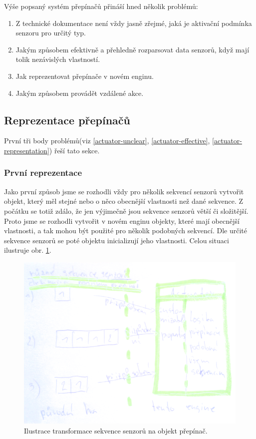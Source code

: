 Výše popsaný systém přepínačů přináší hned několik problémů:
\begin{enumerate}
\item\label{actuator-unclear} Z technické dokumentace\cite{TechnicalDocumentationFontanel05} není vždy jasně zřejmé, jaká je aktivační podmínka senzoru pro určitý typ.
\item\label{actuator-effective} Jakým způsobem efektivně a přehledně rozparsovat data senzorů, když mají tolik nezávislých vlastností.
\item\label{actuator-representation} Jak reprezentovat přepínače v novém enginu.
\item\label{actuator-remote-actions} Jakým způsobem provádět vzdálené akce.
\end{enumerate}

\subsection{Reprezentace přepínačů}
První tři body problémů(viz \ref{actuator-unclear}, \ref{actuator-effective}, \ref{actuator-representation}) řeší tato sekce.

\subsubsection{První reprezentace}\label{rep-v1}

Jako první způsob jsme se rozhodli vždy pro několik sekvencí senzorů vytvořit objekt, který měl stejné nebo o něco obecnější vlastnosti než dané sekvence.
Z počátku se totiž zdálo, že jen výjimečně jsou sekvence senzorů větší či složitější. Proto jsme se rozhodli vytvořit v
novém enginu objekty, které mají obecnější vlastnosti, a tak mohou být použité pro několik podobných sekvencí. Dle určité sekvence senzorů se poté
objektu inicializují jeho vlastnosti. Celou situaci ilustruje obr. \ref{actuator-object}.

\begin{figure}[H]\centering
\includegraphics[width=\textwidth]{./img/actuator-object.png}
\caption{Ilustrace transformace sekvence senzorů na objekt přepínač.}
\label{actuator-object}
\end{figure}

